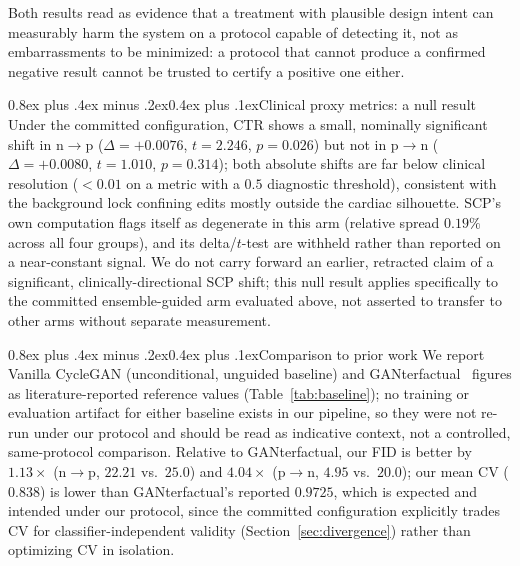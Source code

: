 \documentclass[10pt,twocolumn]{article}
\makeatletter
\renewcommand\subsection{\@startsection{subsection}{2}{\z@}%
  {0.8ex plus .4ex minus .2ex}{0.4ex plus .1ex}{\normalfont\normalsize\bfseries}}
\makeatother
\begin{document}
Both results read as evidence that a treatment with plausible design
intent can measurably harm the system on a protocol capable of detecting
it, not as embarrassments to be minimized: a protocol that cannot produce
a confirmed negative result cannot be trusted to certify a positive one
either.

\subsection{Clinical proxy metrics: a null result}
Under the committed configuration, CTR shows a small, nominally
significant shift in n$\to$p ($\Delta=+0.0076$, $t=2.246$, $p=0.026$) but
not in p$\to$n ($\Delta=+0.0080$, $t=1.010$, $p=0.314$); both absolute
shifts are far below clinical resolution ($<0.01$ on a metric with a
$0.5$ diagnostic threshold), consistent with the background lock
confining edits mostly outside the cardiac silhouette. SCP's own
computation flags itself as degenerate in this arm (relative spread
$0.19\%$ across all four groups), and its delta/$t$-test are withheld
rather than reported on a near-constant signal. We do not carry forward
an earlier, retracted claim of a significant, clinically-directional SCP
shift; this null result applies specifically to the committed
ensemble-guided arm evaluated above, not asserted to transfer to other
arms without separate measurement.

\subsection{Comparison to prior work}
We report Vanilla CycleGAN (unconditional, unguided baseline) and
GANterfactual~\cite{singla2022} figures as literature-reported reference
values (Table~\ref{tab:baseline}); no training or evaluation artifact for
either baseline exists in our pipeline, so they were not re-run under our
protocol and should be read as indicative context, not a controlled,
same-protocol comparison. Relative to GANterfactual, our FID is better by
$1.13\times$ (n$\to$p, $22.21$ vs.\ $25.0$) and $4.04\times$ (p$\to$n,
$4.95$ vs.\ $20.0$); our mean CV ($0.838$) is lower than GANterfactual's
reported $0.9725$, which is expected and intended under our protocol,
since the committed configuration explicitly trades CV for
classifier-independent validity (Section~\ref{sec:divergence}) rather
than optimizing CV in isolation.
\end{document}
